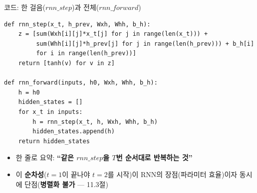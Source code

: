 \begin{frame}[fragile]{코드: 한 걸음($rnn\_step$)과 전체($rnn\_forward$)}
\begin{lstlisting}
def rnn_step(x_t, h_prev, Wxh, Whh, b_h):
    z = [sum(Wxh[i][j]*x_t[j] for j in range(len(x_t))) +
         sum(Whh[i][j]*h_prev[j] for j in range(len(h_prev))) + b_h[i]
         for i in range(len(h_prev))]
    return [tanh(v) for v in z]

def rnn_forward(inputs, h0, Wxh, Whh, b_h):
    h = h0
    hidden_states = []
    for x_t in inputs:
        h = rnn_step(x_t, h, Wxh, Whh, b_h)
        hidden_states.append(h)
    return hidden_states
\end{lstlisting}
  \begin{itemize}
    \item 한 줄로 요약: \textbf{``같은 $rnn\_step$을 $T$번 순서대로
      반복하는 것''}
    \item 이 \textbf{순차성}($t=1$이 끝나야 $t=2$를 시작)이 RNN의
      장점(파라미터 효율)이자 동시에 단점(\textbf{병렬화 불가} ---
      11.3절)
  \end{itemize}
\end{frame}
